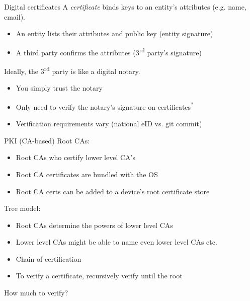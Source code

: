 \begin{frame}{Digital certificates}
  A \emph{certificate} binds keys to an entity's attributes (e.g. name, email).
  \begin{itemize}[<+(1)->]
    \item An entity lists their attributes and public key (entity signature)
    \item A third party confirms the attributes (3\textsuperscript{rd} party's signature)
  \end{itemize}

  \pause
  Ideally, the 3\textsuperscript{rd} party is like a digital notary.
  \begin{itemize}[<+(1)->]
    \item You simply trust the notary
    \item Only need to verify the notary's signature on certificates\textsuperscript{*}
    \item Verification requirements vary (national eID vs. git commit)
  \end{itemize}
\end{frame}

\begin{frame}{PKI (CA-based)}
  \pause
  Root CAs:
  \begin{itemize}[<+(1)->]
    \item Root CAs who certify lower level CA's
    \item Root CA certificates are bundled with the OS
    \item Root CA certs can be added to a device's root certificate store
  \end{itemize}

  \pause
  Tree model:
  \begin{itemize}[<+(1)->]
    \item Root CAs determine the powers of lower level CAs
    \item Lower level CAs might be able to name even lower level CAs etc.
    \item Chain of certification
    \item To verify a certificate, recursively verify until the root
  \end{itemize}

  \pause
  How much to verify?
\end{frame}

